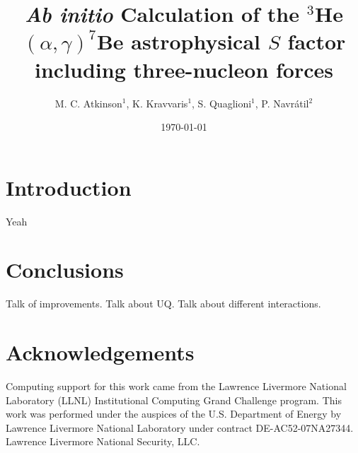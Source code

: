 \documentclass[showpacs,prc,aps,floatfix,hidelinks]{revtex4-1}
\begin{document}
\title{\textit{Ab initio} Calculation of the $^3$He$(\alpha,\gamma)^7$Be astrophysical $S$ factor including three-nucleon forces}
\author{M. C. Atkinson$^1$, K. Kravvaris$^1$, S. Quaglioni$^1$, P. Navr\'{a}til$^2$} 

\date{\today}

\maketitle

\section{Introduction}
\label{sec:intro}

Yeah


\section{Conclusions}
\label{sec:conc}

Talk of improvements. Talk about UQ. Talk about different interactions. 

\section{Acknowledgements}
\label{sec:ack}

Computing support for this work came from the Lawrence Livermore National Laboratory (LLNL) Institutional Computing Grand Challenge program. This work was performed under the auspices of the U.S. Department of Energy by Lawrence Livermore National Laboratory under contract DE-AC52-07NA27344. Lawrence Livermore National Security, LLC. 



\end{document}

